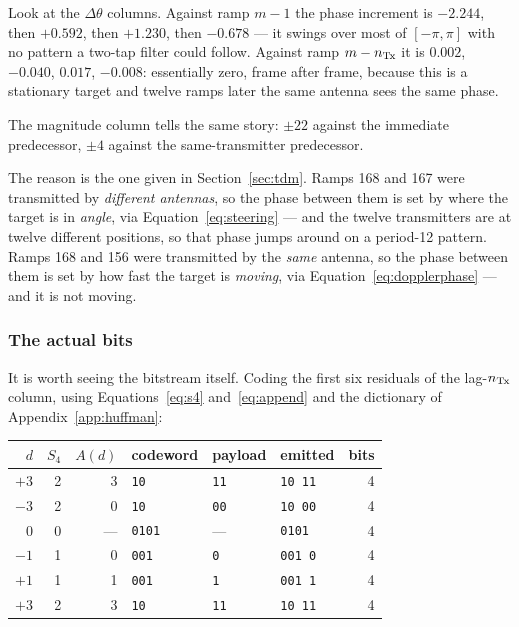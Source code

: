 Look at the $\Delta\theta$ columns. Against ramp $m-1$ the phase increment is
$-2.244$, then $+0.592$, then $+1.230$, then $-0.678$ --- it swings over most
of $[-\pi, \pi]$ with no pattern a two-tap filter could follow. Against ramp
$m - n_{\mathrm{Tx}}$ it is $0.002$, $-0.040$, $0.017$, $-0.008$: essentially
zero, frame after frame, because this is a stationary target and twelve ramps
later the same antenna sees the same phase.

The magnitude column tells the same story: $\pm 22$ against the immediate
predecessor, $\pm 4$ against the same-transmitter predecessor.

The reason is the one given in Section~\ref{sec:tdm}. Ramps 168 and 167 were
transmitted by \emph{different antennas}, so the phase between them is set by
where the target is in \emph{angle}, via
Equation~\eqref{eq:steering} --- and the twelve transmitters are at twelve
different positions, so that phase jumps around on a period-12 pattern. Ramps
168 and 156 were transmitted by the \emph{same} antenna, so the phase between
them is set by how fast the target is \emph{moving}, via
Equation~\eqref{eq:dopplerphase} --- and it is not moving.

\subsubsection*{The actual bits}

It is worth seeing the bitstream itself. Coding the first six residuals of the
lag-$n_{\mathrm{Tx}}$ column, using Equations~\eqref{eq:s4} and~\eqref{eq:append} and the
dictionary of Appendix~\ref{app:huffman}:

\begin{center}
\small
\begin{tabular}{@{}rrrlll r@{}}
\toprule
$d$ & $S_4$ & $A(d)$ & codeword & payload & emitted & bits\\
\midrule
$+3$ & 2 & 3 & \texttt{10}   & \texttt{11}  & \texttt{10\,11}   & 4\\
$-3$ & 2 & 0 & \texttt{10}   & \texttt{00}  & \texttt{10\,00}   & 4\\
$0$  & 0 & --- & \texttt{0101} & ---        & \texttt{0101}     & 4\\
$-1$ & 1 & 0 & \texttt{001}  & \texttt{0}   & \texttt{001\,0}   & 4\\
$+1$ & 1 & 1 & \texttt{001}  & \texttt{1}   & \texttt{001\,1}   & 4\\
$+3$ & 2 & 3 & \texttt{10}   & \texttt{11}  & \texttt{10\,11}   & 4\\
\bottomrule
\end{tabular}
\end{center}

